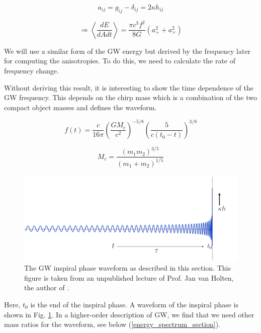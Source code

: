 \begin{equation}
    a_{ij}=g_{ij}-\delta_{ij}=2\kappa h_{ij}
\end{equation}

\begin{equation}
    \Rightarrow \left\langle\frac{dE}{dAdt}\right\rangle=\frac{\pi c^3f^2}{8G}(a_+^2+a_\times^2)
\end{equation}

We will use a similar form of the GW energy but derived by the frequency later for computing the anisotropies. To do this, we need to calculate the rate of frequency change.

Without deriving this result, it is interesting to show the time dependence of the GW frequency. This depends on the chirp mass which is a combination of the two compact object masses and defines the waveform.

\begin{equation}
    f(t)=\frac{c}{16\pi}\left(\frac{GM_c}{c^2}\right)^{-5/8}\left(\frac{5}{c(t_0-t)}\right)^{3/8}
\end{equation}


\begin{equation}
    M_c=\frac{(m_1 m_2)^{3/5}}{(m_1+m_2)^{1/5}}
\end{equation}


\begin{figure}
    \centering
    \includegraphics[width=0.9\linewidth]{Images/waveform_van_holten.PNG}
    \caption[The GW inspiral phase waveform.]{The GW inspiral phase waveform as described in this section. This figure is taken from an unpublished lecture of Prof. Jan van Holten, the author of \cite{van_holten_gravitational_2019}.}
    \label{inspiral_van_holten}
\end{figure} 

Here, $t_0$ is the end of the inspiral phase. A waveform of the inspiral phase is shown in Fig. \ref{inspiral_van_holten}. In a higher-order description of GW, we find that we need other mass ratios for the waveform, see below (\ref{energy_spectrum_section}).


